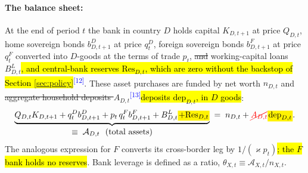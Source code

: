\documentclass[11pt]{article}
\newcommand{\A}[1]{\hl{#1}}
\newcommand{\D}[1]{{\color{red}\st{#1}}}
\newcommand{\Am}[1]{\mathchoice
  {{\setlength{\fboxsep}{1pt}\colorbox{yellow}{$\displaystyle #1$}}}
  {{\setlength{\fboxsep}{1pt}\colorbox{yellow}{$\textstyle #1$}}}
  {{\setlength{\fboxsep}{1pt}\colorbox{yellow}{$\scriptstyle #1$}}}
  {{\setlength{\fboxsep}{1pt}\colorbox{yellow}{$\scriptscriptstyle #1$}}}}
\newcommand{\Dm}[1]{{\color{red}\cancel{#1}}}
\newcommand{\chg}[1]{\textsuperscript{\textcolor{blue}{\scriptsize[#1]}}}
\begin{document}
\paragraph{The balance sheet:} At the end of period $t$ the bank in country $D$ holds capital $K_{D,t+1}$ at price $Q_{D,t}$, home sovereign bonds $b^{D}_{D,t+1}$ at price $q^{D}_t$, foreign sovereign bonds $b^{F}_{D,t+1}$ at price $q^{F}_t$ converted into $D$-goods at the terms of trade $p_t$, \D{and} working-capital loans $B_{D,t}^L$\A{, and central-bank reserves $\mathrm{Res}_{D,t}$, which are zero without the backstop of Section {\ref{sec:policy}}}\chg{12}. These asset purchases are funded by net worth $n_{D,t}$ and \D{aggregate household deposits $A_{D,t}$}\chg{13}\A{deposits $\mathrm{dep}_{D,t}$, in $D$ goods}:
\begin{equation}
\underbrace{Q_{D,t}K_{D,t+1}
   +q^{D}_{t}b^{D}_{D,t+1}
   +p_t\,q^{F}_{t}b^{F}_{D,t+1}
   +B_{D,t}^L\Am{+\mathrm{Res}_{D,t}}}_{\textstyle \equiv\;\mathcal{A}_{D,t}\ \ (\text{total assets})}
\;=\;n_{D,t}+\Dm{A_{D,t}}\Am{\mathrm{dep}_{D,t}}.
\label{eq:balance-sheet}
\end{equation}
The analogous expression for $F$ converts its cross-border leg by $1/(\varkappa p_t)$\A{; the $F$ bank holds no reserves}. Bank leverage is defined as a ratio, $\theta_{X,t}\equiv\mathcal{A}_{X,t}/n_{X,t}$.
\end{document}
